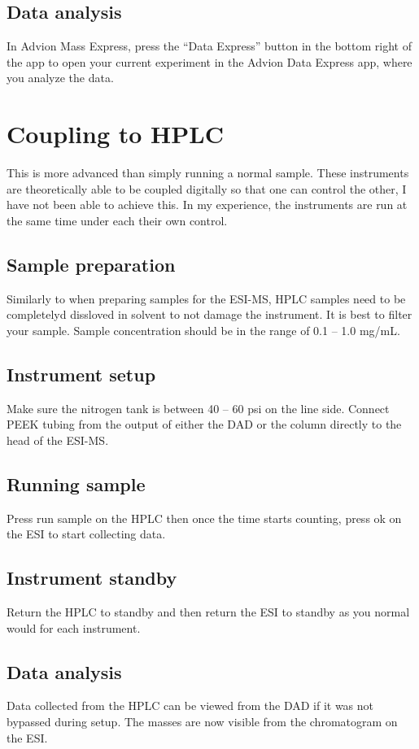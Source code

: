 \documentclass[12pt, letterpaper]{article}
\begin{document}
\subsection{Data analysis}
In Advion Mass Express, press the ``Data Express'' button in the bottom right of the app to open your current experiment in the Advion Data Express app, where you analyze the data.


\section{Coupling to HPLC}
This is more advanced than simply running a normal sample.
These instruments are theoretically able to be coupled digitally so that one can control the other,
I have not been able to achieve this. 
In my experience, the instruments are run at the same time under each their own control.


\subsection{Sample preparation}
Similarly to when preparing samples for the ESI-MS, HPLC samples need to be completelyd dissloved in solvent to not damage the instrument.
It is best to filter your sample.
Sample concentration should be in the range of 0.1 -- 1.0 mg/mL.

\subsection{Instrument setup}
Make sure the nitrogen tank is between 40 -- 60 psi on the line side.
Connect PEEK tubing from the output of either the DAD or the column directly to the head of the ESI-MS.


\subsection{Running sample}
Press run sample on the HPLC then once the time starts counting, press ok on the ESI to start collecting data.

\subsection{Instrument standby}
Return the HPLC to standby and then return the ESI to standby as you normal would for each instrument.

\subsection{Data analysis}
Data collected from the HPLC can be viewed from the DAD if it was not bypassed during setup.
The masses are now visible from the chromatogram on the ESI.
\end{document}
